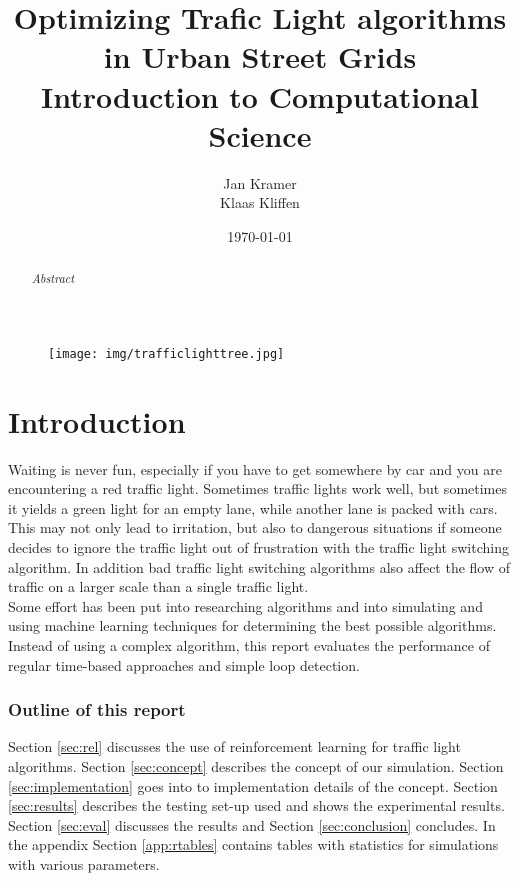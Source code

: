 \documentclass[a4paper,11pt]{article}
\title{Optimizing Trafic Light algorithms in Urban Street Grids\\
\large Introduction to Computational Science}
\author{Jan Kramer\\Klaas Kliffen}
\date{\today}
\begin{document}
\begin{titlepage}
\maketitle
\thispagestyle{empty}
\begin{abstract}
\textit{
 Abstract
}
\end{abstract}
\medskip\medskip
\begin{figure}[H]
  \centering
  \texttt{[image: img/trafficlighttree.jpg]}
\end{figure}


\end{titlepage}

\newpage
\tableofcontents

\newpage

\section{Introduction}
Waiting is never fun, especially if you have to get somewhere by car and you are encountering a red traffic light.
Sometimes traffic lights work well, but sometimes it yields a green light for an empty lane, while another lane is packed with cars.
This may not only lead to irritation, but also to dangerous situations if someone decides to ignore the traffic light out of frustration with the traffic light switching algorithm.
In addition bad traffic light switching algorithms also affect the flow of traffic on a larger scale than a single traffic light.\\

\noindent Some effort has been put into researching algorithms and into simulating and using machine learning techniques for determining the best possible algorithms.
Instead of using a complex algorithm, this report evaluates the performance of regular time-based approaches and simple loop detection.

\subsubsection*{Outline of this report}
Section \ref{sec:rel} discusses the use of reinforcement learning for traffic light algorithms.
Section \ref{sec:concept} describes the concept of our simulation.
Section \ref{sec:implementation} goes into to implementation details of the concept.
Section \ref{sec:results} describes the testing set-up used and shows the experimental results.
Section \ref{sec:eval} discusses the results and Section \ref{sec:conclusion} concludes.
In the appendix Section \ref{app:rtables} contains tables with statistics for simulations with various parameters.
\end{document}
